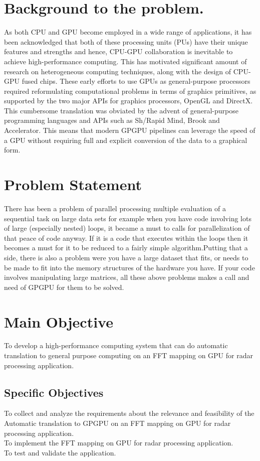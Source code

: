 \documentclass{report}
\begin{document}
\section{Background to the problem.}  
As both CPU and GPU become employed in a wide range of applications, it has been acknowledged that both of these processing units (PUs) have their unique features and strengths and hence, CPU-GPU collaboration is inevitable to achieve high-performance computing. This has motivated significant amount of research on heterogeneous computing techniques, along with the design of CPU-GPU fused chips.
These early efforts to use GPUs as general-purpose processors required reformulating computational problems in terms of graphics primitives, as supported by the two major APIs for graphics processors, OpenGL and DirectX. This cumbersome translation was obviated by the advent of general-purpose programming languages and APIs such as Sh/Rapid Mind, Brook and Accelerator. This means that modern GPGPU pipelines can leverage the speed of a GPU without requiring full and explicit conversion of the data to a graphical form.

\section{Problem Statement}
There has been a problem of parallel processing multiple evaluation of a sequential task on large data sets for example when you have code involving lots of large (especially nested) loops, it became a must to calls for parallelization of that peace of code anyway. If it is a code that executes within the loops then it becomes a must for it to be reduced to a fairly simple algorithm.Putting that a side, there is also a problem were you have a large dataset that fits, or needs to  be made to fit into the memory structures of the hardware you have. If your code involves manipulating large matrices, all these above problems makes a call and need of GPGPU for them to be solved.

\section{Main Objective}
To develop a high-performance computing system that can do automatic translation to general purpose computing on an FFT mapping on GPU for radar processing application.
\subsection{Specific Objectives}
To collect and analyze the requirements about the relevance and feasibility of the Automatic translation to GPGPU on an FFT mapping on GPU for radar processing application.\\ 
To implement the FFT mapping on GPU for radar processing application.\\
To test and validate the application.\\
\end{document}
